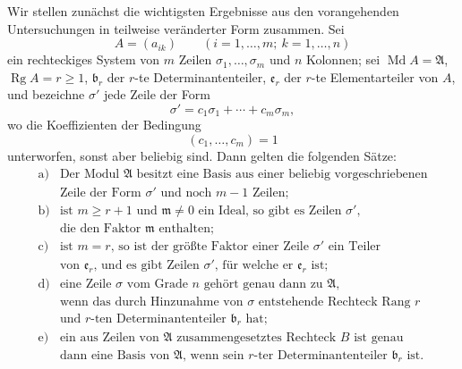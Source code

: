 \documentclass[11pt,a4paper]{article}
\begin{document}
Wir stellen zunächst die wichtigsten Ergebnisse aus den vorangehenden Untersuchungen in teilweise veränderter Form zusammen. Sei
\[
 A=(a_{ik})\qquad(i=1,\ldots,m;\ k=1,\ldots,n)
\]
ein rechteckiges System von \(m\) Zeilen \(\sigma_1,\ldots,\sigma_m\) und \(n\) Kolonnen; sei \(\operatorname{Md}A=\mathfrak A\), \(\operatorname{Rg}A=r\ge1\), \(\mathfrak b_r\) der \(r\)-te Determinantenteiler, \(\mathfrak e_r\) der \(r\)-te Elementarteiler von \(A\), und bezeichne \(\sigma'\) jede Zeile der Form
\[
 \sigma'=c_1\sigma_1+\cdots+c_m\sigma_m,
\]
wo die Koeffizienten der Bedingung
\[
 (c_1,\ldots,c_m)=1 \tag{31}
\]
unterworfen, sonst aber beliebig sind. Dann gelten die folgenden Sätze:
\[
\begin{array}{ll}
\text{a)}&\text{Der Modul \(\mathfrak A\) besitzt eine Basis aus einer beliebig vorgeschriebenen}\\
&\text{Zeile der Form \(\sigma'\) und noch \(m-1\) Zeilen;}\\
\text{b)}&\text{ist \(m\ge r+1\) und \(\mathfrak m\ne0\) ein Ideal, so gibt es Zeilen \(\sigma'\),}\\
&\text{die den Faktor \(\mathfrak m\) enthalten;}\\
\text{c)}&\text{ist \(m=r\), so ist der größte Faktor einer Zeile \(\sigma'\) ein Teiler}\\
&\text{von \(\mathfrak e_r\), und es gibt Zeilen \(\sigma'\), für welche er \(\mathfrak e_r\) ist;}\\
\text{d)}&\text{eine Zeile \(\sigma\) vom Grade \(n\) gehört genau dann zu \(\mathfrak A\),}\\
&\text{wenn das durch Hinzunahme von \(\sigma\) entstehende Rechteck Rang \(r\)}\\
&\text{und \(r\)-ten Determinantenteiler \(\mathfrak b_r\) hat;}\\
\text{e)}&\text{ein aus Zeilen von \(\mathfrak A\) zusammengesetztes Rechteck \(B\) ist genau}\\
&\text{dann eine Basis von \(\mathfrak A\), wenn sein \(r\)-ter Determinantenteiler \(\mathfrak b_r\) ist.}
\end{array}
\]
\end{document}
